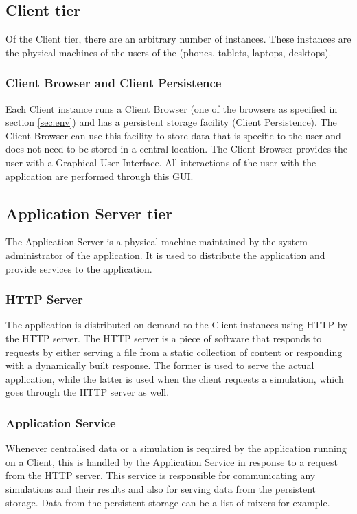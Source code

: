 \subsection{Client tier}
\label{sec:clienttier}
Of the Client tier, there are an arbitrary number of instances. These instances are the physical machines of the users of the \applicationname{} (phones, tablets, laptops, desktops).

\subsubsection{Client Browser and Client Persistence}
\label{sec:clientbrowser} 
Each Client instance runs a Client Browser (one of the browsers as specified in section \ref{sec:env}) and has a persistent storage facility (Client Persistence). The Client Browser can use this facility to store data that is specific to the user and does not need to be stored in a central location. The Client Browser provides the user with a Graphical User Interface. All interactions of the user with the application are performed through this GUI.

\subsection{Application Server tier}
\label{sec:aplicationserver}
The Application Server is a physical machine maintained by the system administrator of the application. It is used to distribute the application and provide services to the application.

\subsubsection{HTTP Server}
\label{sec:httpserver}
The application is distributed on demand to the Client instances using HTTP by the HTTP server. The HTTP server is a piece of software that responds to requests by either serving a file from a static collection of content or responding with a dynamically built response. The former is used to serve the actual application, while the latter is used when the client requests a simulation, which goes through the HTTP server as well.

\subsubsection{Application Service}
\label{sec:applicationservice}
Whenever centralised data or a simulation is required by the application running on a Client, this is handled by the Application Service in response to a request from the HTTP server. This service is responsible for communicating any simulations and their results and also for serving data from the persistent storage. Data from the persistent storage can be a list of mixers for example.

